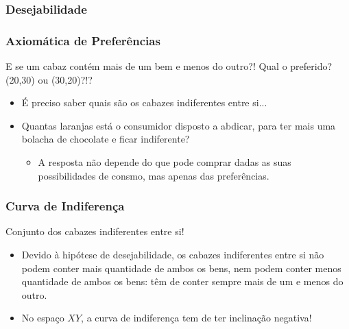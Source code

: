 \begin{frame}
	\frametitle{Desejabilidade}
	\begin{center}
	\end{center}

\end{frame}

\begin{frame}
	\frametitle{Axiom\'atica de Prefer\^encias}
	E se um cabaz cont\'em mais de um bem e menos do outro?! Qual o preferido? (20,30) ou (30,20)?!?
	\vspace{0.2cm}
	\begin{itemize}
		\item<1-> \'E preciso saber quais s\~ao os cabazes indiferentes entre si...
		\item<2-> Quantas laranjas est\'a o consumidor disposto a abdicar, para ter mais uma bolacha de chocolate e ficar indiferente?
		\begin{itemize}
			\item<3-> A resposta n\~ao depende do que pode comprar dadas as suas possibilidades de consmo, mas apenas das prefer\^encias.
		\end{itemize}
	\end{itemize}

\end{frame}

\begin{frame}
	\frametitle{Curva de Indiferen\c ca}
	\begin{tcolorbox}[title=Curva de indiferen\c ca]
		Conjunto dos cabazes indiferentes entre si!
	\end{tcolorbox}

	\begin{itemize}
		\item<2-> Devido \`a hip\'otese de desejabilidade, os cabazes indiferentes entre si n\~ao podem conter mais quantidade de ambos os bens, nem podem conter menos quantidade de ambos os bens: t\^em de conter sempre mais de um e menos do outro.
		\item<3-> No espa\c co $XY$, a curva de indiferen\c ca tem de ter inclina\c c\~ao negativa!
	\end{itemize}

\end{frame}


